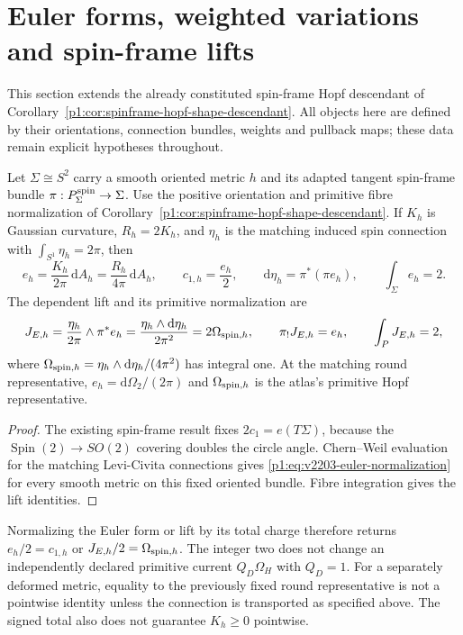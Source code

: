 \documentclass[11pt]{article}
\begin{document}
\section{Euler forms, weighted variations and spin-frame lifts}
\label{p1:sec:v2203-euler-work-geometry}

This section extends the already constituted spin-frame Hopf descendant of
Corollary~\ref{p1:cor:spinframe-hopf-shape-descendant}. All objects here are
defined by their orientations, connection bundles, weights and pullback
maps; these data remain explicit hypotheses throughout.

\begin{proposition}
\label{p1:prop:v2203-euler-spin-lift}
Let \(\Sigma\cong S^2\) carry a smooth oriented metric \(h\) and its
adapted tangent spin-frame bundle \(\pi:P^{\rm spin}_\Sigma\to\Sigma\).
Use the positive orientation and primitive fibre normalization of
Corollary~\ref{p1:cor:spinframe-hopf-shape-descendant}. If \(K_h\) is Gaussian
curvature, \(R_h=2K_h\), and \(\eta_h\) is the matching induced spin
connection with \(\int_{S^1}\eta_h=2\pi\), then
\begin{equation}
\label{p1:eq:v2203-euler-normalization}
 e_h=\frac{K_h}{2\pi}\,\mathrm dA_h
     =\frac{R_h}{4\pi}\,\mathrm dA_h,
 \qquad c_{1,h}=\frac{e_h}{2},
 \qquad \mathrm d\eta_h=\pi^*(\pi e_h),
 \qquad \int_\Sigma e_h=2.
\end{equation}
The dependent lift and its primitive normalization are
\[
 J_{E,h}=\frac{\eta_h}{2\pi}\wedge\pi^*e_h
 =\frac{\eta_h\wedge\mathrm d\eta_h}{2\pi^2}
 =2\Omega_{{\rm spin},h},\qquad
 \pi_!J_{E,h}=e_h,\qquad \int_PJ_{E,h}=2,
\]
where \(\Omega_{{\rm spin},h}=\eta_h\wedge\mathrm d\eta_h/(4\pi^2)\)
has integral one. At the matching round representative,
\(e_h=\mathrm d\Omega_2/(2\pi)\) and
\(\Omega_{{\rm spin},h}\) is the atlas's primitive Hopf representative.
\end{proposition}
\begin{proof}
The existing spin-frame result fixes \(2c_1=e(T\Sigma)\), because the
\(\operatorname{Spin}(2)\to SO(2)\) covering doubles the circle angle.
Chern--Weil evaluation for the matching Levi-Civita connections gives
\eqref{p1:eq:v2203-euler-normalization} for every smooth metric on this
fixed oriented bundle. Fibre integration gives the lift identities.
\end{proof}
Normalizing the Euler form or lift by its total charge therefore returns
\(e_h/2=c_{1,h}\) or \(J_{E,h}/2=\Omega_{{\rm spin},h}\). The integer two
does not change an independently declared primitive current
\(Q_D\Omega_H\) with \(Q_D=1\). For a separately deformed metric, equality
to the previously fixed round representative is not a pointwise identity
unless the connection is transported as specified above. The signed total
also does not guarantee \(K_h\ge0\) pointwise.
\end{document}
